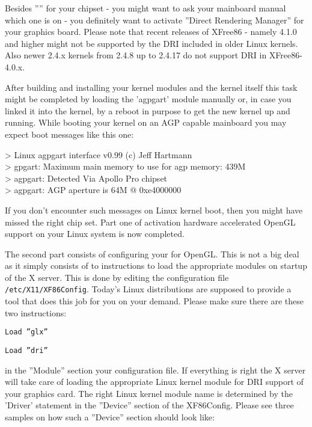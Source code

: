 Besides '''' for your chipset - you might want to ask
your mainboard manual which one is on - you definitely want to activate
''Direct Rendering Manager'' for your graphics board. Please note that
recent releases of XFree86 - namely 4.1.0 and higher might not be supported
by the DRI included in older Linux kernels. Also newer 2.4.x kernels from
2.4.8 up to 2.4.17 do not support DRI in XFree86-4.0.x.

After building and installing your kernel modules and the kernel itself this
task might be completed by loading the 'agpgart' module manually or, in case
you linked it into the kernel, by a reboot in purpose to get the new kernel
up and running. While booting your kernel on an AGP capable mainboard you
may expect boot messages like this one:
\medskip

\begin{ttfamily}
\noindent
> Linux agpgart interface v0.99 (c) Jeff Hartmann\\
> gpgart: Maximum main memory to use for agp memory: 439M\\
> agpgart: Detected Via Apollo Pro chipset\\
> agpgart: AGP aperture is 64M @ 0xe4000000
\end{ttfamily}
\medskip

If you don't encounter such messages on Linux kernel boot, then you might
have missed the right chip set. Part one of activation hardware accelerated OpenGL support on your Linux system is now completed.

The second part consists of configuring your  for OpenGL. This is
not a big deal as it simply consists of to instructions to load the
appropriate modules on startup of the X server.
This is done by editing the configuration file \texttt{/etc/X11/XF86Config}. Today's
Linux distributions are supposed to provide a tool that does this job for
you on your demand. Please make sure there are these two instructions:
\medskip


 \texttt{Load ''glx''}
 
 \texttt{Load ''dri''}
\medskip

\noindent
in the ''Module'' section your  configuration file. If everything is
right the X server will take care of loading the appropriate Linux kernel
module for DRI support of your graphics card. The right Linux kernel module
name is determined by the 'Driver' statement in the ''Device'' section of the
XF86Config. Please see three samples on how such a ''Device'' section should
look like:
\medskip

